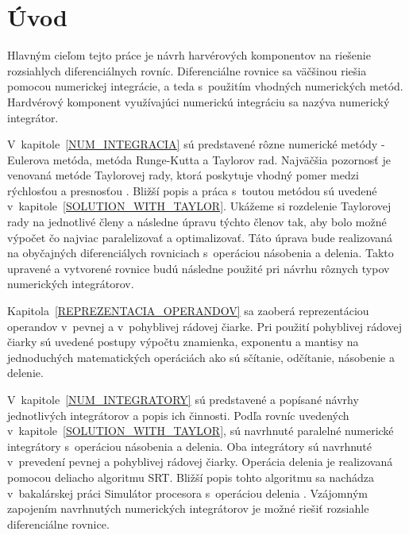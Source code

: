 


\chapter{Úvod}
Hlavným cieľom tejto práce je návrh harvérových komponentov na riešenie rozsiahlych diferenciálnych rovníc. Diferenciálne rovnice sa väčšinou riešia pomocou numerickej integrácie, a teda s~použitím vhodných numerických metód. Hardvérový komponent využívajúci numerickú integráciu sa nazýva numerický integrátor.

V~kapitole~\ref{NUM_INTEGRACIA} sú predstavené rôzne numerické metódy - Eulerova metóda, metóda Runge-Kutta a Taylorov rad. Najväčšia pozornosť je venovaná metóde Taylorovej rady, ktorá poskytuje vhodný pomer medzi rýchlosťou a presnosťou \cite{KunovskyH}. Bližší popis a práca s~toutou metódou sú uvedené v~kapitole~\ref{SOLUTION_WITH_TAYLOR}. Ukážeme si rozdelenie Taylorovej rady na jednotlivé členy a následne úpravu týchto členov tak, aby bolo možné výpočet čo najviac paralelizovať a optimalizovať. Táto úprava bude realizovaná na obyčajných diferenciálych rovniciach s~operáciou násobenia a delenia. Takto upravené a vytvorené rovnice budú následne použité pri návrhu rôznych typov numerických integrátorov.

Kapitola~\ref{REPREZENTACIA_OPERANDOV} sa zaoberá reprezentáciou operandov v~pevnej a v~pohyblivej rádovej čiarke. Pri použití pohyblivej rádovej čiarky sú uvedené postupy výpočtu znamienka, exponentu a mantisy na jednoduchých matematických operáciách ako sú sčítanie, odčítanie, násobenie a delenie.

V~kapitole~\ref{NUM_INTEGRATORY} sú predstavené a popísané návrhy jednotlivých integrátorov a popis ich činnosti. Podľa rovníc uvedených v~kapitole~\ref{SOLUTION_WITH_TAYLOR}, sú navrhnuté paralelné numerické integrátory s~operáciou násobenia a delenia. Oba integrátory sú navrhnuté v~prevedení pevnej a pohyblivej rádovej čiarky. Operácia delenia je realizovaná pomocou deliacho algoritmu SRT. Bližší popis tohto algoritmu sa nachádza v~bakalárskej práci Simulátor procesora s~operáciou delenia \cite{MatecnyBP}.
Vzájomným zapojením navrhnutých numerických integrátorov je možné riešiť rozsiahle diferenciálne rovnice.




